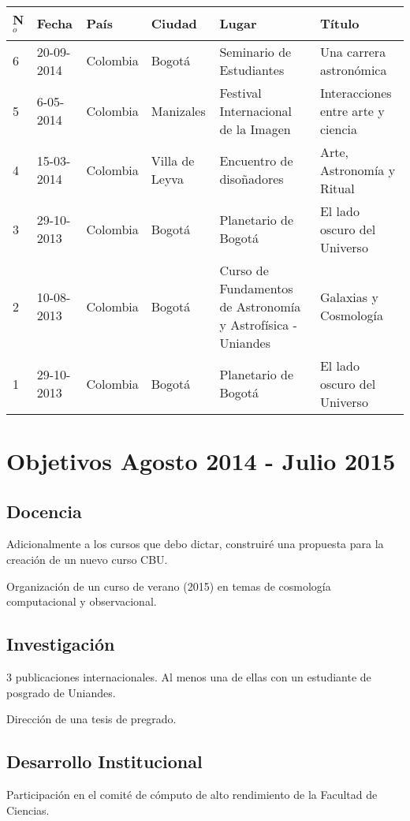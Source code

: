 \documentclass{article}
\begin{document}
\begin{tabular}{l l l l p{3cm} p{4cm}}\hline
N$^{o}$ & Fecha & Pa\'is & Ciudad & Lugar & T\'itulo\\\hline
6 & 20-09-2014 & Colombia & Bogot\'a & Seminario de Estudiantes & Una
carrera astron\'omica \\ \hline
5 & 6-05-2014 & Colombia & Manizales & Festival Internacional de la
Imagen & Interacciones entre arte y ciencia\\ \hline
4 & 15-03-2014  & Colombia & Villa de Leyva & Encuentro de
diso\~nadores & Arte, Astronomía y Ritual \\ \hline
3 & 29-10-2013 & Colombia & Bogot\'a & Planetario de Bogot\'a & El
lado oscuro del Universo\\ \hline 
2 & 10-08-2013 & Colombia & Bogot\'a & Curso de Fundamentos de
Astronom\'ia y Astrof\'isica - Uniandes & Galaxias y
Cosmolog\'ia\\    \hline
1 & 29-10-2013 & Colombia & Bogot\'a & Planetario de Bogot\'a & El
lado oscuro del Universo\\ \hline 
\end{tabular}



\section{Objetivos Agosto 2014 - Julio 2015}


\subsection{Docencia}
Adicionalmente a los cursos que debo dictar, construir\'e una
propuesta para la creaci\'on de un nuevo curso CBU.

Organizaci\'on de un curso de verano (2015) en temas de cosmolog\'ia
computacional y observacional.


\subsection{Investigaci\'on}
3 publicaciones internacionales. Al menos una de ellas con un
estudiante de posgrado de Uniandes.

Direcci\'on de una tesis de pregrado.

\subsection{Desarrollo Institucional}
Participaci\'on en el comit\'e  de c\'omputo de alto rendimiento de la
Facultad de Ciencias.
\end{document}
